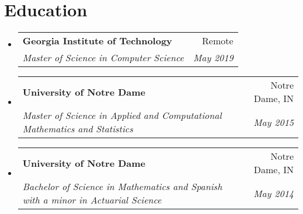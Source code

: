 \documentclass[letterpaper,11pt]{article}
\makeatletter
\newcommand{\resumeSubheading}[4]{
  \vspace{-2pt}\item
    \begin{tabular*}{0.97\textwidth}[t]{l@{\extracolsep{\fill}}r}
      \textbf{#1} & #2 \\
      \textit{\small#3} & \textit{\small #4} \\
    \end{tabular*}\vspace{-7pt}
}
\newcommand{\resumeSubHeadingListStart}{\begin{itemize}[leftmargin=0.15in, label={}]}
\newcommand{\resumeSubHeadingListEnd}{\end{itemize}}
\makeatother
\begin{document}
\section{Education}
  \resumeSubHeadingListStart
    \resumeSubheading
      {Georgia Institute of Technology}{Remote}
      {Master of Science in Computer Science}{May 2019}

    \resumeSubheading
      {University of Notre Dame}{Notre Dame, IN}
      {Master of Science in Applied and Computational Mathematics and Statistics}{May 2015}

    \resumeSubheading
      {University of Notre Dame}{Notre Dame, IN}
      {Bachelor of Science in Mathematics and Spanish with a minor in Actuarial Science}{May 2014}
  \resumeSubHeadingListEnd
\end{document}
